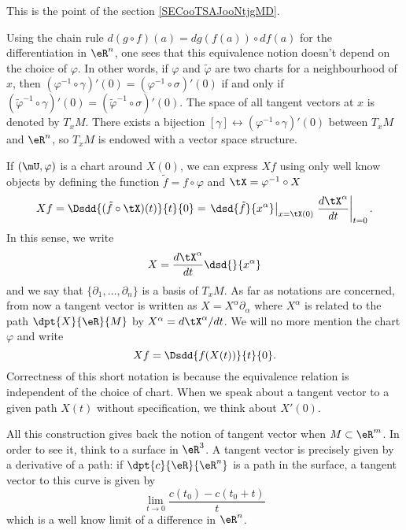 This is the point of the section \ref{SECooTSAJooNtjgMD}.

Using the chain rule $d(g\circ f)(a)=dg(f(a))\circ df(a)$ for the differentiation in $\eR^n$, one sees that this equivalence notion doesn't depend on the choice of $\varphi$. In other words, if $\varphi$ and $\tilde{\varphi}$ are two charts for a neighbourhood of $x$, then $(\varphi^{-1} \circ\gamma)'(0)=(\varphi^{-1} \circ\sigma)'(0)$ if and only if $(\tilde{\varphi}^{-1} \circ\gamma)'(0)=(\tilde{\varphi}^{-1} \circ\sigma)'(0)$. The space of all tangent vectors at $x$ is denoted by $T_xM$. There exists a bijection $[\gamma]\leftrightarrow (\varphi^{-1}\circ\gamma)'(0)$ between $T_xM$ and $\eR^n$, so $T_xM$ is endowed with a vector space structure.

If $(\mU,\varphi)$ is a chart around $X(0)$, we can express $Xf$ using only well know objects by defining the function $\tilde f =f\circ\varphi$ and $\tX=\varphi^{-1}\circ X$
\[
	Xf=\Dsdd{ (\tilde f \circ\tX)(t) }{t}{0}=\left.\dsd{\tilde f }{x^{\alpha}}\right|_{x=\tX(0)}\left.\frac{d\tX^{\alpha}}{dt}\right|_{t=0}.
\]
In this sense, we write
\begin{equation}
	X=\frac{d\tX^{\alpha}}{dt} \dsd{}{x^{\alpha}}
\end{equation}
and we say that $\{\partial_1,\ldots,\partial_n\}$ is a basis of $T_xM$. As far as notations are concerned, from now a tangent vector is written as $X=X^{\alpha}\partial_{\alpha}$ where $X^{\alpha}$ is related to the path $\dpt{X}{\eR}{M}$ by $X^{\alpha}=d\tX^{\alpha}/dt$. We will no more mention the chart $\varphi$ and write
\[
	Xf=\Dsdd{f(X(t))}{t}{0}.
\]
Correctness of this short notation is because the equivalence relation is independent of the choice of chart. When we speak about a tangent vector to a given path $X(t)$ without specification, we think about $X'(0)$.

All this construction gives back the notion of tangent vector when $M\subset \eR^m$. In order to see it, think to a surface in $\eR^3$. A tangent vector is precisely given by a derivative of a path: if $\dpt{c}{\eR}{\eR^n}$ is a path in the surface, a tangent vector to this curve is given by
\[
	\lim_{t\to 0}\frac{c(t_0)-c(t_0+t)}{t}
\]
which is a well know limit of a difference in $\eR^n$.

